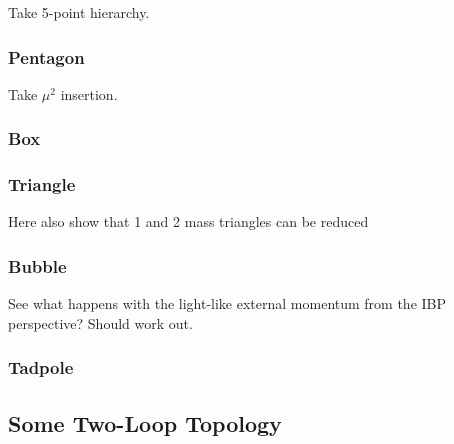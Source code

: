 Take 5-point hierarchy.

\subsubsection{Pentagon}

Take $\mu^2$ insertion.

\subsubsection{Box}

\subsubsection{Triangle}

Here also show that 1 and 2 mass triangles can be reduced

\subsubsection{Bubble}

See what happens with the light-like external momentum from the IBP perspective?
Should work out.

\subsubsection{Tadpole}

\subsection{Some Two-Loop Topology}


